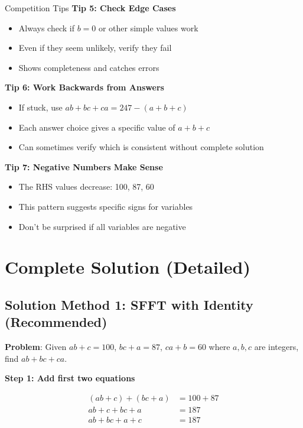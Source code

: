 \documentclass[12pt]{article}
\begin{document}
\begin{protipbox}{Competition Tips}
\textbf{Tip 5: Check Edge Cases}
\begin{itemize}
    \item Always check if $b = 0$ or other simple values work
    \item Even if they seem unlikely, verify they fail
    \item Shows completeness and catches errors
\end{itemize}

\textbf{Tip 6: Work Backwards from Answers}
\begin{itemize}
    \item If stuck, use $ab+bc+ca = 247 - (a+b+c)$
    \item Each answer choice gives a specific value of $a+b+c$
    \item Can sometimes verify which is consistent without complete solution
\end{itemize}

\textbf{Tip 7: Negative Numbers Make Sense}
\begin{itemize}
    \item The RHS values decrease: 100, 87, 60
    \item This pattern suggests specific signs for variables
    \item Don't be surprised if all variables are negative
\end{itemize}

\end{protipbox}

\section*{Complete Solution (Detailed)}

\subsection*{Solution Method 1: SFFT with Identity (Recommended)}

\textbf{Problem}: Given $ab + c = 100$, $bc + a = 87$, $ca + b = 60$ where $a, b, c$ are integers, find $ab + bc + ca$.

\textbf{Step 1: Add first two equations}

\begin{align*}
(ab + c) + (bc + a) &= 100 + 87\\
ab + c + bc + a &= 187\\
ab + bc + a + c &= 187
\end{align*}
\end{document}
